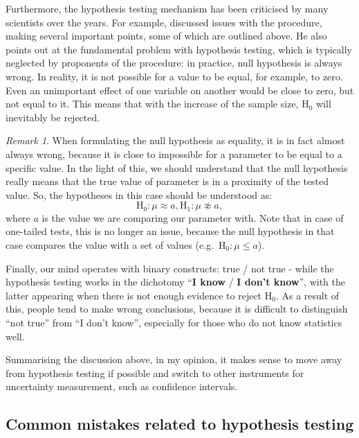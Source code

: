 \documentclass[
]{book}
\theoremstyle{definition}
\theoremstyle{definition}
\theoremstyle{definition}
\theoremstyle{definition}
\theoremstyle{remark}
\newtheorem*{remark}{Remark}
\begin{document}
Furthermore, the hypothesis testing mechanism has been criticised by many scientists over the years. For example, \citet{Cohen1994} discussed issues with the procedure, making several important points, some of which are outlined above. He also points out at the fundamental problem with hypothesis testing, which is typically neglected by proponents of the procedure: in practice, null hypothesis is always wrong. In reality, it is not possible for a value to be equal, for example, to zero. Even an unimportant effect of one variable on another would be close to zero, but not equal to it. This means that with the increase of the sample size, \(\mathrm{H}_0\) will inevitably be rejected.

\begin{remark}
When formulating the null hypothesis as equality, it is in fact almost always wrong, because it is close to impossible for a parameter to be equal to a specific value. In the light of this, we should understand that the null hypothesis really means that the true value of parameter is in a proximity of the tested value. So, the hypotheses in this case should be understood as:
\begin{equation*}
    \mathrm{H}_0: \mu \approx a, \mathrm{H}_1: \mu \not\approx a ,
\end{equation*}
where \(a\) is the value we are comparing our parameter with. Note that in case of one-tailed tests, this is no longer an issue, because the null hypothesis in that case compares the value with a set of values (e.g.~\(\mathrm{H}_0: \mu\leq a\)).
\end{remark}

Finally, our mind operates with binary constructs: true / not true - while the hypothesis testing works in the dichotomy ``\textbf{I know} / \textbf{I don't know}'', with the latter appearing when there is not enough evidence to reject \(\mathrm{H}_0\). As a result of this, people tend to make wrong conclusions, because it is difficult to distinguish ``not true'' from ``I don't know'', especially for those who do not know statistics well.

Summarising the discussion above, in my opinion, it makes sense to move away from hypothesis testing if possible and switch to other instruments for uncertainty measurement, such as confidence intervals.

\hypertarget{hypothesisTestingMistakes}{%
\subsection{Common mistakes related to hypothesis testing}\label{hypothesisTestingMistakes}}
\end{document}

